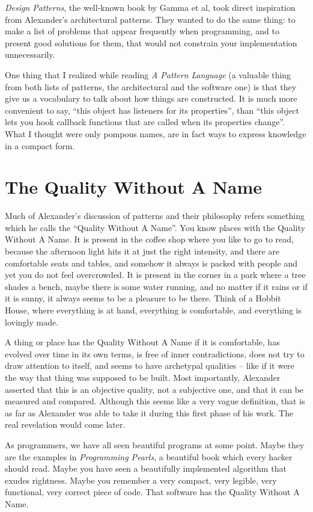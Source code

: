 \textit{Design Patterns}, the well-known book by Gamma et al, took direct
inspiration from Alexander's architectural patterns. They wanted to do the same
thing: to make a list of problems that appear frequently when programming, and
to present good solutions for them, that would not constrain your implementation
unnecessarily.

One thing that I realized while reading \textit{A Pattern Language} (a valuable
thing from both lists of patterns, the architectural and the software one) is
that they give us a vocabulary to talk about how things are constructed. It is
much more convenient to say, ``this object has listeners for its properties'',
than ``this object lets you hook callback functions that are called when its
properties change''. What I thought were only pompous names, are in fact ways to
express knowledge in a compact form.

\section*{The Quality Without A Name}

Much of Alexander's discussion of patterns and their philosophy refers something
which he calls the ``Quality Without A Name''. You know places with the Quality
Without A Name. It is present in the coffee shop where you like to go to read,
because the afternoon light hits it at just the right intensity, and there are
comfortable seats and tables, and somehow it always is packed with people and
yet you do not feel overcrowded. It is present in the corner in a park where a
tree shades a bench, maybe there is some water running, and no matter if it
rains or if it is sunny, it always seems to be a pleasure to be there. Think of
a Hobbit House, where everything is at hand, everything is comfortable, and
everything is lovingly made.

A thing or place has the Quality Without A Name if it is comfortable, has
evolved over time in its own terms, is free of inner contradictions, does not
try to draw attention to itself, and seems to have archetypal qualities -- like
if it were the way that thing was supposed to be built. Most importantly,
Alexander asserted that this is an objective quality, not a subjective one, and
that it can be measured and compared. Although this seems like a very vague
definition, that is as far as Alexander was able to take it during this first
phase of his work. The real revelation would come later.

As programmers, we have all seen beautiful programs at some point. Maybe they
are the examples in \textit{Programming Pearls}, a beautiful book which every
hacker should read. Maybe you have seen a beautifully implemented algorithm that
exudes rightness. Maybe you remember a very compact, very legible, very
functional, very correct piece of code. That software has the Quality Without A
Name.

